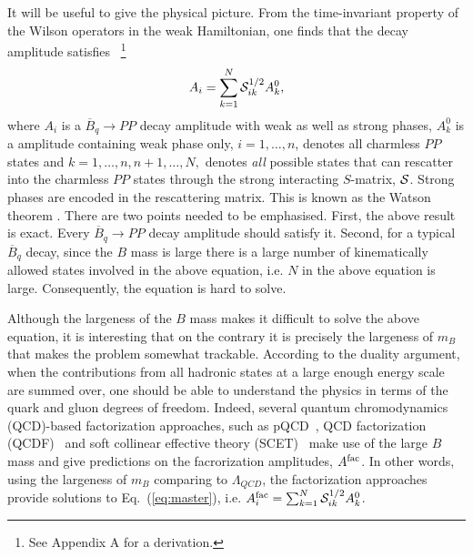 \documentclass[aps,preprint,floats,epsf,epsfig,nofootinbib,letter]{revtex4}
\newcommand{\be}{\begin{eqnarray}}
\newcommand{\en}{\end{eqnarray}}
\newcommand{\ov}{\overline}
\newcommand{\Sc}{{\cal S}}
\begin{document}
It will be useful to give the physical picture.
From the time-invariant property of the Wilson operators in the weak Hamiltonian, one finds that the decay amplitude satisfies \cite{Suzuki:1999uc}~\footnote{See Appendix A for a derivation.} 
 \be
 A_i=\sum_{k=1}^N\Sc^{1/2}_{ik} A^0_k,
 \label{eq:master}
 \en
where  $A_i$ 
is a $\ov B_q\to PP$ decay amplitude with weak as well as strong phases, 
$A^0_k$ is a amplitude containing weak phase only, $i=1,\dots,n$, denotes all charmless $PP$ states and
$k=1,\dots,n,n+1,\dots,N,$ denotes {\it all} possible states that
can rescatter into the charmless $PP$ states
through the strong interacting $S$-matrix, $\Sc$.
Strong phases are encoded in the rescattering matrix. 
This is known as the Watson theorem \cite{Watson:1952ji}.
There are two points needed to be emphasised.
First, the above result is exact. Every $\ov B{}_q\to PP$ decay amplitude should satisfy it.
Second, for a typical $\overline B{}_q$
decay, since the $B$ mass is large there is a large number of kinematically allowed states involved in the above equation, i.e. $N$ in the above equation is large.
Consequently, the equation is hard to solve.


Although the largeness of the $B$ mass 
makes it difficult to solve the above equation, 
it is interesting that on the contrary it is precisely the largeness of $m_B$ that makes the problem somewhat trackable. 
According to the duality argument,
when the contributions from all hadronic
states at a large enough energy scale are summed over, one should
be able to understand the physics in terms of the quark and gluon
degrees of freedom.
Indeed, several quantum chromodynamics (QCD)-based factorization approaches, such
as pQCD~\cite{pQCD}, QCD factorization
(QCDF)~\cite{Beneke:2001ev,Beneke:2003zv} and soft collinear
effective theory (SCET)~\cite{SCET}
make use of the large $B$ mass
 and give predictions on
the facrorization amplitudes, $A^{\rm fac}$. 
In other words, using the largeness of $m_B$ comparing to $\Lambda_{QCD}$, 
the factorization approaches provide solutions to Eq.~(\ref{eq:master}), 
i.e. $ A^{\rm fac}_i=\sum_{k=1}^N\Sc^{1/2}_{ik} A^0_k$.
\end{document}
